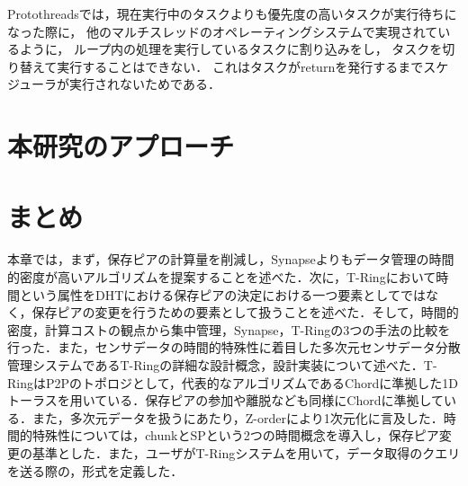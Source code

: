 
Protothreadsでは，現在実行中のタスクよりも優先度の高いタスクが実行待ちになった際に，
他のマルチスレッドのオペレーティングシステムで実現されているように，
ループ内の処理を実行しているタスクに割り込みをし，
タスクを切り替えて実行することはできない．
これはタスクがreturnを発行するまでスケジューラが実行されないためである．


\section{本研究のアプローチ}


\section{まとめ}
本章では，まず，保存ピアの計算量を削減し，Synapseよりもデータ管理の時間的密度が高いアルゴリズムを提案することを述べた．次に，T-Ringにおいて時間という属性をDHTにおける保存ピアの決定における一つ要素としてではなく，保存ピアの変更を行うための要素として扱うことを述べた．そして，時間的密度，計算コストの観点から集中管理，Synapse，T-Ringの3つの手法の比較を行った．また，センサデータの時間的特殊性に着目した多次元センサデータ分散管理システムであるT-Ringの詳細な設計概念，設計実装について述べた．T-RingはP2Pのトポロジとして，代表的なアルゴリズムであるChordに準拠した1Dトーラスを用いている．保存ピアの参加や離脱なども同様にChordに準拠している．また，多次元データを扱うにあたり，Z-orderにより1次元化に言及した．時間的特殊性については，chunkとSPという2つの時間概念を導入し，保存ピア変更の基準とした．また，ユーザがT-Ringシステムを用いて，データ取得のクエリを送る際の，形式を定義した．



